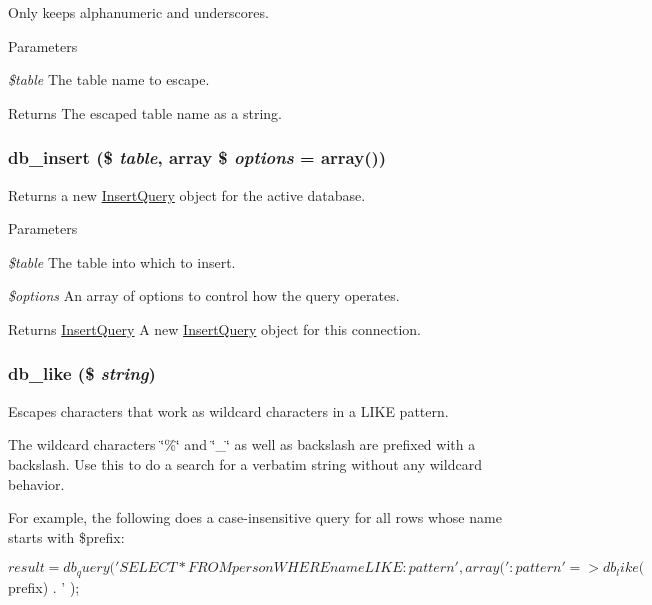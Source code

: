 Only keeps alphanumeric and underscores.


\begin{DoxyParams}{Parameters}
\item[{\em \$table}]The table name to escape.\end{DoxyParams}
\begin{DoxyReturn}{Returns}
The escaped table name as a string. 
\end{DoxyReturn}
\hypertarget{group__database_gaadfbffaf30ff5eb14f1bd88619351345}{
\subsubsection[{db\_\-insert}]{\setlength{\rightskip}{0pt plus 5cm}db\_\-insert (\$ {\em table}, \/  array \$ {\em options} = {\ttfamily array()})}}
\label{group__database_gaadfbffaf30ff5eb14f1bd88619351345}
Returns a new \hyperlink{classInsertQuery}{InsertQuery} object for the active database.


\begin{DoxyParams}{Parameters}
\item[{\em \$table}]The table into which to insert. \item[{\em \$options}]An array of options to control how the query operates.\end{DoxyParams}
\begin{DoxyReturn}{Returns}
\hyperlink{classInsertQuery}{InsertQuery} A new \hyperlink{classInsertQuery}{InsertQuery} object for this connection. 
\end{DoxyReturn}
\hypertarget{group__database_ga4e86622a079f0992dbb987e66320be7a}{
\subsubsection[{db\_\-like}]{\setlength{\rightskip}{0pt plus 5cm}db\_\-like (\$ {\em string})}}
\label{group__database_ga4e86622a079f0992dbb987e66320be7a}
Escapes characters that work as wildcard characters in a LIKE pattern.

The wildcard characters \char`\"{}\%\char`\"{} and \char`\"{}\_\-\char`\"{} as well as backslash are prefixed with a backslash. Use this to do a search for a verbatim string without any wildcard behavior.

For example, the following does a case-\/insensitive query for all rows whose name starts with \$prefix: 
\begin{DoxyCode}
 $result = db_query(
   'SELECT * FROM person WHERE name LIKE :pattern',
   array(':pattern' => db_like($prefix) . '%
 );
\end{DoxyCode}


